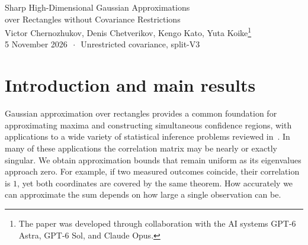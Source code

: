 \documentclass[11pt,letterpaper]{article}
\theoremstyle{remark}
\begin{document}
\begin{center}
{\Large Sharp High-Dimensional Gaussian Approximations\\[0.15em]
over Rectangles without Covariance Restrictions}\\[0.85em]
{\normalsize Victor Chernozhukov, Denis Chetverikov, Kengo Kato, Yuta
Koike\renewcommand{\thefootnote}{\fnsymbol{footnote}}\footnote{The paper
was developed through collaboration with the AI systems GPT-6 Astra,
GPT-6 Sol, and Claude Opus.}}\\[0.65em]
{\normalsize 5 November 2026 \(\,\cdot\,\) Unrestricted covariance, split-V3}
\end{center}
\setcounter{footnote}{0}
\thispagestyle{plain}

\begin{abstract}

We study how well a sum of \(n\) independent random vectors with \(p\)
coordinates can be approximated by a Gaussian vector with the same
mean and covariance. We measure the error over rectangles, so the bounds apply
to maxima and simultaneous confidence regions. The coordinates may
be arbitrarily dependent, even exactly linearly dependent, and the
bounds do not deteriorate as the covariance matrix becomes singular.
After standardizing the coordinate variances, bounded or
sub-exponential coordinates give the familiar \(n^{-1/2}\) sample-size
rate up to logarithmic factors, with the size or tail bounds held
fixed. For bounded coordinates, a refinement uses fourth moments to
reduce the logarithmic loss when large observations contribute little
to the variance. If we instead impose a fixed moment bound of order
\(q>4\) on the largest absolute coordinate, together with a coordinate
fourth-moment bound, the rate becomes \(n^{-1/2+1/q}\) up to
logarithmic factors. At \(q=4\), the slower \(n^{-1/4}\) rate is
unavoidable, confirming our earlier conjecture. We also allow the
bounds on observation size to grow with \(n\). Lower-bound examples
show that the dependence on sample size and observation size is sharp
up to logarithmic factors in the regimes studied, and in several
regimes the upper and lower bounds match including the logarithmic
terms.
\end{abstract}

\begingroup
\setcounter{tocdepth}{1}
\small
\tableofcontents
\endgroup
\clearpage

\section{\texorpdfstring{Introduction and main results}{Introduction and main results}}\label{sec:results}
Gaussian approximation over rectangles provides a common foundation for
approximating maxima and constructing simultaneous confidence regions, with
applications to a wide variety of statistical inference problems reviewed in~\cite{CCKK2023}.
In many of these applications the correlation matrix may be nearly or
exactly singular. We obtain approximation bounds that remain uniform
as its eigenvalues approach zero. For example, if two measured outcomes
coincide, their correlation is \(1\), yet both coordinates are covered
by the same theorem. How accurately we can approximate the sum depends on how large a
single observation can be.
\end{document}
